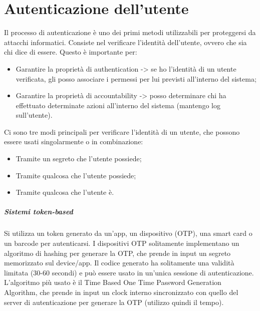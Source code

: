 \chapter{Autenticazione dell'utente}
Il processo di autenticazione è uno dei primi metodi utilizzabili per proteggersi da attacchi informatici. Consiste nel verificare l'identità dell'utente, ovvero che sia chi dice di essere. 
Questo è importante per:
\begin{itemize}
    \item Garantire la proprietà di authentication -> se ho l'identità di un utente verificata, gli posso associare i permessi per lui previsti all'interno del sistema;
    \item Garantire la proprietà di accountability -> posso determinare chi ha effettuato determinate azioni all'interno del sistema (mantengo log sull'utente).
\end{itemize}

Ci sono tre modi principali per verificare l'identità di un utente, che possono essere usati singolarmente o in combinazione:
\begin{itemize}
    \item Tramite un segreto che l'utente possiede;
    \item Tramite qualcosa che l'utente possiede;
    \item Tramite qualcosa che l'utente è.
\end{itemize}

\paragraph{Sistemi token-based} Si utilizza un token generato da un'app, un dispositivo (OTP), una smart card o un barcode per autenticarsi. 
I dispositivi OTP solitamente implementano un algoritmo di hashing per generare la OTP, che prende in input un segreto memorizzato sul device/app. Il codice generato ha solitamente una validità limitata (30-60 secondi) e può essere usato in un'unica sessione di autenticazione. L'algoritmo più usato è il Time Based One Time Password Generation Algorithm, che prende in input un clock interno sincronizzato con quello del server di autenticazione per generare la OTP (utilizzo quindi il tempo).

